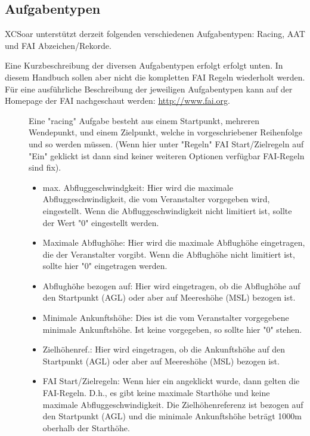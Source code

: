 \subsection*{Aufgabentypen}

\textsf{XCSoar} unterstützt derzeit folgenden verschiedenen Aufgabentypen:
Racing, AAT und FAI Abzeichen/Rekorde.

Eine Kurzbeschreibung der diversen Aufgabentypen erfolgt erfolgt unten. In diesem Handbuch sollen aber nicht die kompletten FAI Regeln wiederholt werden. Für eine ausführliche Beschreibung der jeweiligen Aufgabentypen kann  auf der Homepage der FAI nachgeschaut werden: \url{http://www.fai.org}.

\begin{description}
\item[] Eine  "racing" Aufgabe besteht aus einem Startpunkt, mehreren Wendepunkt,  und einem Zielpunkt, welche in vorgeschriebener Reihenfolge und so werden müssen. (Wenn hier unter "Regeln" FAI Start/Zielregeln auf "Ein" geklickt ist dann sind keiner weiteren Optionen verfügbar FAI-Regeln sind fix).
        \begin{itemize}
            \item max. Abfluggeschwindgkeit:     Hier wird die maximale Abfluggeschwindigkeit, die vom Veranstalter vorgegeben wird, eingestellt. Wenn die Abfluggeschwindigkeit nicht limitiert ist, sollte der Wert "0"  eingestellt werden.
            \item Maximale Abflughöhe: Hier wird die maximale Abflughöhe eingetragen, die der Veranstalter vorgibt.   Wenn die Abflughöhe nicht limitiert ist, sollte hier "0" eingetragen werden.
            \item Abflughöhe bezogen auf: Hier wird eingetragen, ob die Abflughöhe auf den Startpunkt (AGL) oder aber auf  Meereshöhe (MSL) bezogen ist.
            \item Minimale Ankunftshöhe:  Dies ist die vom Veranstalter vorgegebene minimale Ankunftshöhe. Ist keine vorgegeben, so sollte hier "0"  stehen.
            \item Zielhöhenref.:  Hier wird eingetragen, ob die Ankunftshöhe auf den  Startpunkt (AGL) oder aber auf  Meereshöhe (MSL) bezogen ist.
            \item FAI Start/Zielregeln: Wenn hier ein angeklickt wurde,  dann  gelten die FAI-Regeln. D.h., es gibt keine maximale Starthöhe und keine maximale Abfluggeschwindigkeit. Die Zielhöhenreferenz ist bezogen auf den Startpunkt (AGL) und die minimale Ankunftshöhe beträgt 1000m oberhalb der Starthöhe. 

\end{itemize}
\end{description}
